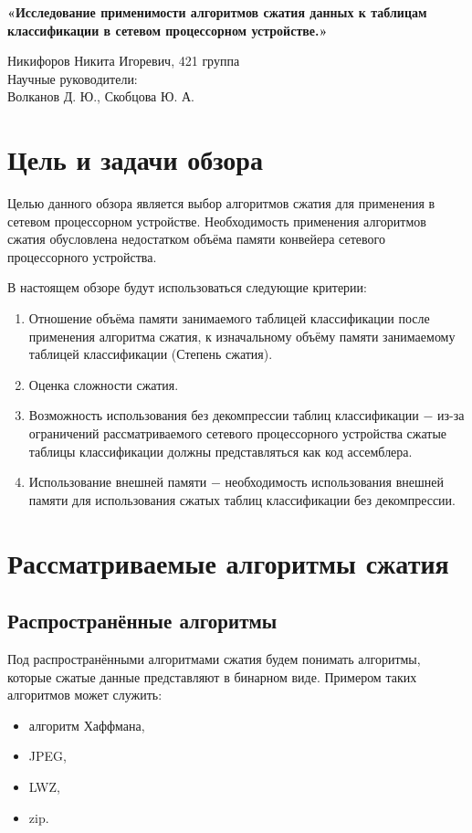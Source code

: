 \documentclass[a4peper, 12pt, titlepage, finall]{extreport}
\begin{document}
\begin{center}
    {\large \bf «Исследование применимости алгоритмов сжатия данных к таблицам классификации в сетевом процессорном устройстве.»}

\end{center}
        \begin{flushright}
            {Никифоров Никита Игоревич, 421 группа}\\
            {Научные руководители:\\ Волканов Д. Ю., Скобцова Ю. А.}
        \end{flushright}
    \section{Цель и задачи обзора}
        Целью данного обзора является выбор алгоритмов сжатия для применения в сетевом процессорном устройстве. 
        Необходимость применения алгоритмов сжатия обусловлена недостатком объёма памяти конвейера сетевого процессорного устройства.
        
        В настоящем обзоре будут использоваться следующие критерии:
        \begin{enumerate}
            \item Отношение объёма памяти занимаемого таблицей классификации после применения алгоритма сжатия, 
                к изначальному объёму памяти занимаемому таблицей классификации (Степень сжатия).
            \item Оценка сложности сжатия.
            \item Возможность использования без декомпрессии таблиц классификации $-$ 
                из-за ограничений рассматриваемого сетевого процессорного устройства сжатые таблицы классификации 
                должны представляться как код ассемблера.
            \item Использование внешней памяти $-$ необходимость использования внешней памяти 
                для использования сжатых таблиц классификации без декомпрессии.
        \end{enumerate}

    \section{Рассматриваемые алгоритмы сжатия}
        \subsection{Распространённые алгоритмы}
            Под распространёнными алгоритмами сжатия будем понимать алгоритмы, 
            которые сжатые данные представляют в бинарном виде. 
            Примером таких алгоритмов может служить:
            \begin{itemize}
                \item алгоритм Хаффмана,
                \item JPEG,
                \item LWZ,
                \item zip.
            \end{itemize}
            
\end{document}
